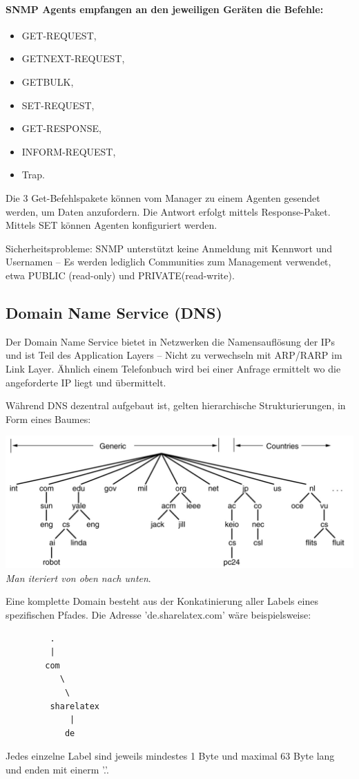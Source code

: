 \documentclass{scrartcl}
\begin{document}
    \paragraph{SNMP Agents empfangen an den jeweiligen Geräten die Befehle:} 
    \begin{itemize}
        \item GET-REQUEST,
        \item GETNEXT-REQUEST,
        \item GETBULK,
        \item SET-REQUEST,
        \item GET-RESPONSE,
        \item INFORM-REQUEST,
        \item Trap.
    \end{itemize}
    Die 3 Get-Befehlspakete können vom Manager zu einem Agenten gesendet werden, um Daten anzufordern. Die Antwort erfolgt mittels Response-Paket.
    Mittels SET können Agenten konfiguriert werden.
    
    Sicherheitsprobleme: SNMP unterstützt keine Anmeldung mit Kennwort und Usernamen -- Es werden lediglich Communities zum Management verwendet, etwa PUBLIC (read-only) und PRIVATE(read-write).
    
    \subsection{Domain Name Service (DNS)}
    \label{protocols:dns}
    Der Domain Name Service bietet in Netzwerken die Namensauflösung der IPs und ist Teil des Application Layers -- Nicht zu verwechseln mit ARP/RARP im Link Layer.
    Ähnlich einem Telefonbuch wird bei einer Anfrage ermittelt wo die angeforderte IP liegt und übermittelt.

    Während DNS dezentral aufgebaut ist, gelten hierarchische Strukturierungen, in Form eines Baumes:
    \begin{center}
        \includegraphics[width=\textwidth]{DNSNameSpace.png}\\
        \textit{Man iteriert von oben nach unten}.
    \end{center}
    Eine komplette Domain besteht aus der Konkatinierung aller Labels eines spezifischen Pfades. 
    Die Adresse 'de.sharelatex.com' wäre beispielsweise:
    \begin{verbatim}
         .
         |
        com
           \
            \
         sharelatex
             |
            de
    \end{verbatim}
    Jedes einzelne Label sind jeweils mindestes 1 Byte und maximal 63 Byte lang und enden mit einerm '.'.
    
\end{document}
